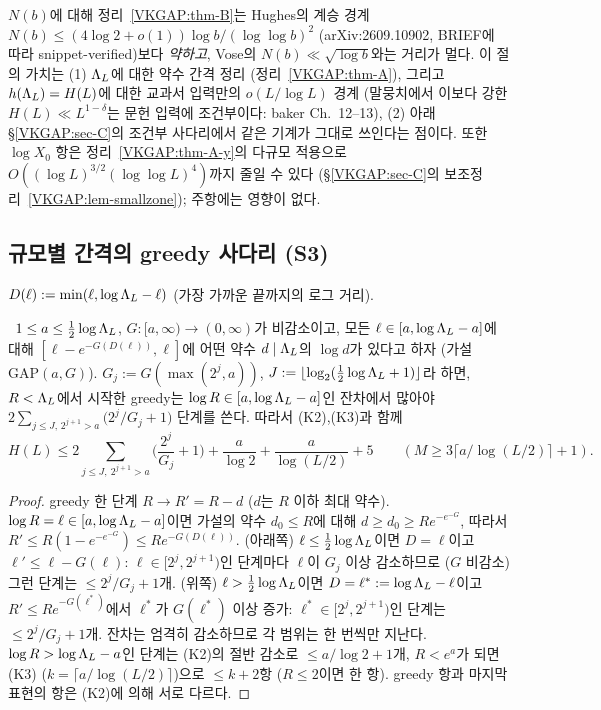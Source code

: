 \begin{remark}[정직한 위치]\label{VKGAP:rem-B-honest}
$N(b)$에 대해 정리~\ref{VKGAP:thm-B}는 Hughes의 계승 경계 $N(b)\le(4\log2+o(1))\log b/(\log\log b)^2$
(arXiv:2609.10902, BRIEF에 따라 snippet-verified)보다 \emph{약하고}, Vose의 $N(b)\ll\sqrt{\log b}$와는 거리가 멀다.
이 절의 가치는 (1) $\Lambda_L$에 대한 약수 간격 정리 (정리~\ref{VKGAP:thm-A}), 그리고 $h(\Lambda_L)=H(L)$에 대한 교과서 입력만의 $o(L/\log L)$ 경계
(말뭉치에서 이보다 강한 $H(L)\ll L^{1-\delta}$는 문헌 입력에 조건부이다: baker Ch.~12--13), (2) 아래 \S\ref{VKGAP:sec-C}의 조건부 사다리에서 같은 기계가 그대로 쓰인다는 점이다.
또한 $\log X_0$ 항은 정리~\ref{VKGAP:thm-A-y}의 다규모 적용으로 $O((\log L)^{3/2}(\log\log L)^4)$까지 줄일 수 있다
(\S\ref{VKGAP:sec-C}의 보조정리~\ref{VKGAP:lem-smallzone}); 주항에는 영향이 없다.
\end{remark}

\subsection{규모별 간격의 greedy 사다리 (S3)}
\label{VKGAP:sec-S3}

$D(\ell):=\min(\ell,\log\Lambda_L-\ell)$ (가장 가까운 끝까지의 로그 거리).

\begin{lemma}\label{VKGAP:lem-greedy}
\PROVED\ $1\le a\le\frac12\log\Lambda_L$, $G:[a,\infty)\to(0,\infty)$가 비감소이고, 모든 $\ell\in[a,\log\Lambda_L-a]$에 대해
$[\ell-e^{-G(D(\ell))},\ell]$에 어떤 약수 $d\mid\Lambda_L$의 $\log d$가 있다고 하자 (가설 $\mathrm{GAP}(a,G)$).
$G_j:=G(\max(2^j,a))$, $J:=\lfloor\log_2(\frac12\log\Lambda_L+1)\rfloor$라 하면, $R<\Lambda_L$에서 시작한 greedy는
$\log R\in[a,\log\Lambda_L-a]$인 잔차에서 많아야 $2\sum_{j\le J,\,2^{j+1}>a}\big(2^j/G_j+1\big)$ 단계를 쓴다. 따라서 (K2),(K3)과 함께
\[
H(L)\le 2\!\!\sum_{j\le J,\ 2^{j+1}>a}\!\!\Big(\frac{2^j}{G_j}+1\Big)+\frac{a}{\log2}+\frac{a}{\log(L/2)}+5\qquad(M\ge 3\lceil a/\log(L/2)\rceil+1).
\]
\end{lemma}
\begin{proof}
greedy 한 단계 $R\to R'=R-d$ ($d$는 $R$ 이하 최대 약수). $\log R=\ell\in[a,\log\Lambda_L-a]$이면 가설의 약수 $d_0\le R$에 대해
$d\ge d_0\ge Re^{-e^{-G}}$, 따라서 $R'\le R(1-e^{-e^{-G}})\le Re^{-G(D(\ell))}$.
(아래쪽) $\ell\le\frac12\log\Lambda_L$이면 $D=\ell$이고 $\ell'\le\ell-G(\ell)$: $\ell\in[2^j,2^{j+1})$인 단계마다 $\ell$이 $G_j$ 이상 감소하므로
($G$ 비감소) 그런 단계는 $\le 2^j/G_j+1$개.
(위쪽) $\ell>\frac12\log\Lambda_L$이면 $D=\ell^*:=\log\Lambda_L-\ell$이고 $R'\le Re^{-G(\ell^*)}$에서 $\ell^*$가 $G(\ell^*)$ 이상 증가:
$\ell^*\in[2^j,2^{j+1})$인 단계는 $\le2^j/G_j+1$개. 잔차는 엄격히 감소하므로 각 범위는 한 번씩만 지난다.
$\log R>\log\Lambda_L-a$인 단계는 (K2)의 절반 감소로 $\le a/\log2+1$개, $R<e^a$가 되면 (K3) ($k=\lceil a/\log(L/2)\rceil$)으로 $\le k+2$항
($R\le2$이면 한 항). greedy 항과 마지막 표현의 항은 (K2)에 의해 서로 다르다.
\end{proof}


